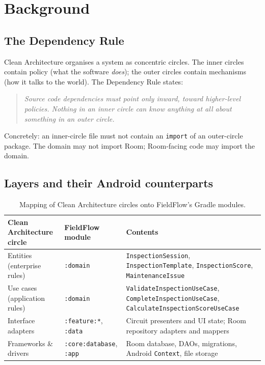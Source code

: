 \documentclass[11pt,a4paper]{article}
\newcommand{\mdl}[1]{\texttt{#1}}
\newcommand{\file}[1]{{\small\texttt{#1}}}
\begin{document}
\section{Background}

\subsection{The Dependency Rule}

Clean Architecture organises a system as concentric circles. The inner circles
contain policy (what the software \emph{does}); the outer circles contain
mechanisms (how it talks to the world). The Dependency Rule states:

\begin{quote}\itshape
Source code dependencies must point only inward, toward higher-level policies.
Nothing in an inner circle can know anything at all about something in an outer
circle.
\end{quote}

Concretely: an inner-circle file must not contain an \texttt{import} of an
outer-circle package. The domain may not import Room; Room-facing code may
import the domain.

\subsection{Layers and their Android counterparts}

\begin{table}[H]
\centering
\small
\begin{tabularx}{\linewidth}{@{}l l X@{}}
\toprule
\textbf{Clean Architecture circle} & \textbf{FieldFlow module} & \textbf{Contents} \\
\midrule
Entities (enterprise rules)   & \mdl{:domain}          & \file{InspectionSession}, \file{InspectionTemplate}, \file{InspectionScore}, \file{MaintenanceIssue} \\
Use cases (application rules) & \mdl{:domain}          & \file{ValidateInspectionUseCase}, \file{CompleteInspectionUseCase}, \file{CalculateInspectionScoreUseCase} \\
Interface adapters            & \mdl{:feature:*}, \mdl{:data} & Circuit presenters and UI state; Room repository adapters and mappers \\
Frameworks \& drivers         & \mdl{:core:database}, \mdl{:app} & Room database, DAOs, migrations, Android \texttt{Context}, file storage \\
\bottomrule
\end{tabularx}
\caption{Mapping of Clean Architecture circles onto FieldFlow's Gradle modules.}
\end{table}
\end{document}
